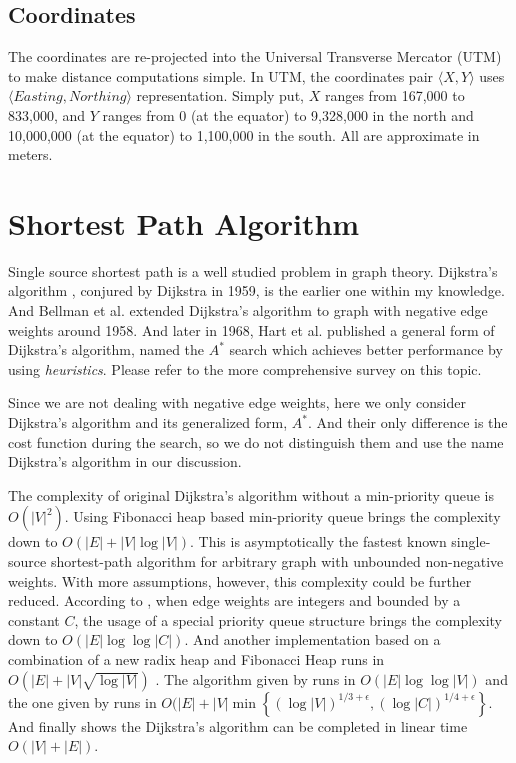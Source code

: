\documentclass[11pt]{article}
\begin{document}
\subsection{Coordinates}
\label{sec-2-4}

The coordinates are re-projected into the Universal Transverse
Mercator (UTM) \cite{Wikipedia:utm} to make distance computations
simple.  In UTM, the coordinates pair \(\langle X, Y\rangle\) uses
\(\langle Easting, Northing\rangle\) representation.  Simply put,
\(X\) ranges from 167,000 to 833,000, and \(Y\) ranges from 0 (at
the equator) to 9,328,000 in the north and 10,000,000 (at the
equator) to 1,100,000 in the south.  All are approximate in meters.

\section{Shortest Path Algorithm}
\label{sec-3}

Single source shortest path is a well studied problem in graph
theory.  Dijkstra's algorithm \cite{Dijkstra:1959}, conjured by
Dijkstra in 1959, is the earlier one within my knowledge.  And
Bellman et al. extended Dijkstra's algorithm to graph with negative
edge weights \cite{bellman:1958} around 1958.  And later in 1968,
Hart et al. published a general form of Dijkstra's algorithm, named
the \(A^*\) search which achieves better performance by using
\emph{heuristics}.  Please refer to the more comprehensive survey
\cite{Cherkassky:1996} on this topic.

Since we are not dealing with negative edge weights, here we only
consider Dijkstra's algorithm and its generalized form, \(A^*\).
And their only difference is the cost function during the search,
so we do not distinguish them and use the name Dijkstra's algorithm
in our discussion.

The complexity of original Dijkstra's algorithm without a
min-priority queue is \(O(|V|^2)\).  Using Fibonacci heap based
min-priority queue \cite{Fredman:1984} brings the complexity down
to \(O(|E| + |V|\log|V|)\).  This is asymptotically the fastest
known single-source shortest-path algorithm for arbitrary graph
with unbounded non-negative weights.  With more assumptions,
however, this complexity could be further reduced.  According to
\cite{Wikipedia:dijkstra}, when edge weights are integers and
bounded by a constant \(C\), the usage of a special priority queue
structure \cite{VanEmdeboas:1976} brings the complexity down to
\(O(|E|\log\log|C|)\).  And another implementation based on a
combination of a new radix heap and Fibonacci Heap runs in
\(O(|E| + |V|\sqrt{\log|V|})\) \cite{Ahuja:1990}.  The algorithm
given by \cite{Thorup:2000} runs in \(O(|E|\log\log|V|)\) and the
one given by \cite{Raman:1997} runs in
\(O(|E| + |V|\min{\left\{(\log|V|)^{1/3+\epsilon},
  (\log|C|)^{1/4+\epsilon}\right\}}\).  And finally
\cite{Thorup:1999} shows the Dijkstra's algorithm can be completed
in linear time \(O(|V|+|E|)\).
\end{document}
